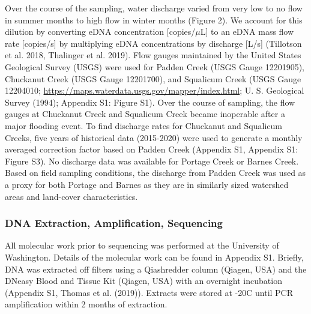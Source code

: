 \documentclass[
]{article}
\begin{document}
Over the course of the sampling, water discharge varied from very low to
no flow in summer months to high flow in winter months (Figure 2). We
account for this dilution by converting eDNA concentration
{[}copies/\(\mu\)L{]} to an eDNA mass flow rate {[}copies/s{]} by
multiplying eDNA concentrations by discharge {[}L/s{]} (Tillotson et al.
2018, Thalinger et al. 2019). Flow gauges maintained by the United
States Geological Survey (USGS) were used for Padden Creek (USGS Gauge
12201905), Chuckanut Creek (USGS Gauge 12201700), and Squalicum Creek
(USGS Gauge 12204010;
\url{https://maps.waterdata.usgs.gov/mapper/index.html}; U. S.
Geological Survey (1994); Appendix S1: Figure S1). Over the course of
sampling, the flow gauges at Chuckanut Creek and Squalicum Creek became
inoperable after a major flooding event. To find discharge rates for
Chuckanut and Squalicum Creeks, five years of historical data
(2015-2020) were used to generate a monthly averaged correction factor
based on Padden Creek (Appendix S1, Appendix S1: Figure S3). No
discharge data was available for Portage Creek or Barnes Creek. Based on
field sampling conditions, the discharge from Padden Creek was used as a
proxy for both Portage and Barnes as they are in similarly sized
watershed areas and land-cover characteristics.

\hypertarget{dna-extraction-amplification-sequencing}{%
\subsubsection{DNA Extraction, Amplification,
Sequencing}\label{dna-extraction-amplification-sequencing}}

All molecular work prior to sequencing was performed at the University
of Washington. Details of the molecular work can be found in Appendix
S1. Briefly, DNA was extracted off filters using a Qiashredder column
(Qiagen, USA) and the DNeasy Blood and Tissue Kit (Qiagen, USA) with an
overnight incubation (Appendix S1, Thomas et al. (2019)). Extracts were
stored at -20\degree C until PCR amplification within 2 months of
extraction.
\end{document}

